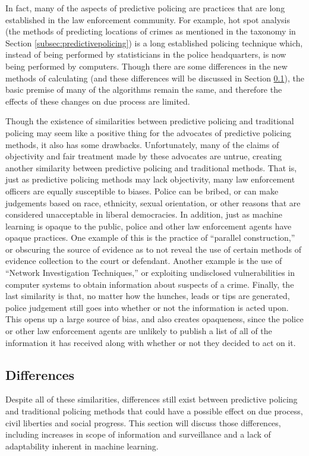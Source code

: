 \documentclass[12pt]{article} %
\begin{document}
In fact, many of the aspects of predictive policing are practices that are long established in the law enforcement community. \cite{pearsall2010predictive} For example, hot spot analysis (the methods of predicting locations of crimes as mentioned in the taxonomy in Section \ref{subsec:predictivepolicing}) is a long established policing technique which, instead of being performed by statisticians in the police headquarters, is now being performed by computers. Though there are some differences in the new methods of calculating  (and these differences will be discussed in Section \ref{subsec:differences}), the basic premise of many of the algorithms remain the same, and therefore the effects of these changes on due process are limited.

Though the existence of similarities between predictive policing and traditional policing may seem like a positive thing for the advocates of predictive policing methods, it also has some drawbacks. Unfortunately, many of the claims of objectivity and fair treatment made by these advocates are untrue, creating another similarity between predictive policing and traditional methods. That is, just as predictive policing methods may lack objectivity, many law enforcement officers are equally susceptible to biases. Police can be bribed, or can make judgements based on race, ethnicity, sexual orientation, or other reasons that are considered unacceptable in liberal democracies. In addition, just as machine learning is opaque to the public, police and other law enforcement agents have opaque practices. One example of this is the practice of ``parallel construction,'' or obscuring the source of evidence as to not reveal the use of certain methods of evidence collection to the court or defendant. \cite{cushing_2016} Another example is the use of ``Network Investigation Techniques,'' or exploiting undisclosed vulnerabilities in computer systems to obtain information about suspects of a crime. \cite{cox_jeong_2016} Finally, the last similarity is that, no matter how the hunches, leads or tips are generated, police judgement still goes into whether or not the information is acted upon. This opens up a large source of bias, and also creates opaqueness, since the police or other law enforcement agents are unlikely to publish a list of all of the information it has received along with whether or not they decided to act on it. 

\subsection{Differences}\label{subsec:differences}
Despite all of these similarities, differences still exist between predictive policing and traditional policing methods that could have a possible effect on due process, civil liberties and social progress. This section will discuss those differences, including increases in scope of information and surveillance and a lack of adaptability inherent in machine learning.
\end{document}
